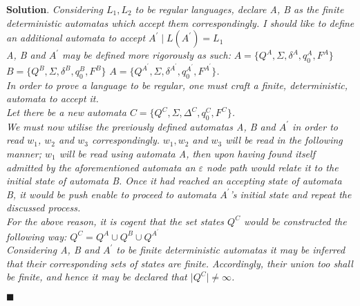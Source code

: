 \documentclass[12pt]{article}
\renewcommand{\=}[1]{\stackrel{#1}{=}} %
\theoremstyle{definition}
\newenvironment{s}{%
        \begin{trivlist} \item \textbf{Solution}. }{%
            \hspace*{\fill} $\blacksquare$\end{trivlist}}%
\begin{document}
\begin{s} \newline
  \emph{Considering $L_1, L_2$ to be regular languages, declare A, B as the finite deterministic automatas which accept them correspondingly. I should like to define an additional automata to accept $A^{\prime} \mid L(A^{\prime}) = L_1$} \newline
\\
  \emph{A, B and $A^{\prime}$ may be defined more rigorously as such:} \newline
\emph{$A = \{Q^{A}, \Sigma,\delta^{A}, q_0^{A} ,F^{A}\}$} \newline
\emph{$B = \{Q^{B}, \Sigma,\delta^{B}, q_0^{B} ,F^{B}\}$} \newline
  \emph{$A = \{Q^{A^{\prime}}, \Sigma,\delta^{A^{\prime}}, q_0^{A^{\prime}} ,F^{A^{\prime}}\}$.} \newline
\\
\emph{In order to prove a language to be regular, one must craft a finite, deterministic, automata to accept it.} \newline
\\
\emph{Let there be a new automata $C = \{Q^{C}, \Sigma, \Delta^{C}, q_0^{C}, F^{C}\}$.} \newline 
\\
  \emph{We must now utilise the previously defined automatas A, B and $A^{\prime}$ in order to read $w_1$, $w_2$ and $w_3$ correspondingly.} \newline
  \emph{$w_1, w_2$ and $w_3$ will be read in the following manner; $w_1$ will be read using automata A, then upon having found itself admitted by the aforementioned automata an $\varepsilon$ node path would relate it to the initial state of automata B. Once it had reached an accepting state of automata B, it would be push enable to proceed to automata $A^{\prime}$'s initial state and repeat the discussed process.} \newline
\\
  \emph{For the above reason, it is cogent that the set states $Q^{C}$ would be constructed the following way: $Q^{C} = Q^{A} \cup Q^{B} \cup Q^{A^{\prime}}$} \newline
\\
  \emph{Considering A, B and $A^{\prime}$ to be finite deterministic automatas it may be inferred that their corresponding sets of states are finite. Accordingly, their union too shall be finite, and hence it may be declared that $\lvert Q^{C} \rvert \ne \infty$.} \newline

\end{s}
\end{document}
